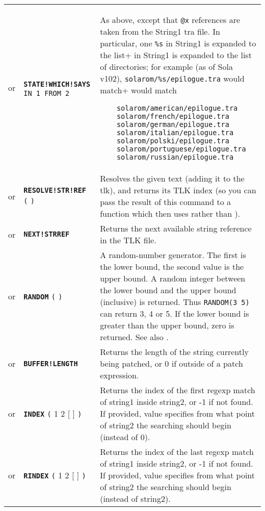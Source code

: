 \documentclass{article}
\def\ttref#1{\ahrefloc{#1}{\tt #1}}
\def\DEFINE#1{{\tt \bf #1}\label{#1}\index{#1}}
\def\DEFSYN#1{{\tt \bf #1}\index{#1}}
\def\t#1{{\tt #1}}
\def\Ob{{\color{red} [ }}
\def\Oe{{\color{red} ] }}
\begin{document}
\begin{tabular}{cp{10in}|p{10in}}
or & \DEFSYN{STATE!WHICH!SAYS} \t{\ttref{value} IN \ttref{String}1 FROM \ttref{String}2} &
  As above, except that \t{@x} references are taken from
    the String1 tra file. In particular, one \verb+%s+ in String1 is expanded to the list
    of directories; for example (as of Sola v102), \verb+solarom/%s/epilogue.tra+ would match
\begin{verbatim}
    solarom/american/epilogue.tra
    solarom/french/epilogue.tra
    solarom/german/epilogue.tra
    solarom/italian/epilogue.tra
    solarom/polski/epilogue.tra
    solarom/portuguese/epilogue.tra
    solarom/russian/epilogue.tra
\end{verbatim}
\\
or & \DEFINE{RESOLVE!STR!REF} \t{(} \ttref{text} \t{)} &
Resolves the given text (adding it to the tlk), and returns its TLK index
(so you can pass the result of this command to a function which then uses
\ttref{WRITE!LONG} rather than \ttref{SAY}).
\\
or & \DEFINE{NEXT!STRREF} &
Returns the next available string reference in the TLK file.
\\
or & \DEFINE{RANDOM} \t{(} \ttref{value} \ttref{value} \t{)} &
A random-number generator. The first \ttref{value} is the lower bound, the
second value is the upper bound. A random integer between the lower bound
and the upper bound (inclusive) is returned. Thus \t{RANDOM(3 5)} can
return 3, 4 or 5. If the lower bound is greater than the upper bound, zero
is returned. See also \ttref{RANDOM!SEED}. \\

or & \DEFINE{BUFFER!LENGTH} &
Returns the length of the string currently being patched, or 0 if outside of
a patch expression. \\

or & \DEFINE{INDEX} \t{(} \ttref{optcase}  \ttref{optexact} \ttref{string}1
\ttref{string}2 \Ob \ttref{value} \Oe \t{)} &
Returns the index of the first regexp match of string1 inside string2, or
-1 if not found. If provided, value specifies from what point of string2
the searching should begin (instead of 0).
\\

or & \DEFINE{RINDEX} \t{(}  \ttref{optcase}  \ttref{optexact} \ttref{string}1
\ttref{string}2 \Ob \ttref{value} \Oe \t{)} &
Returns the index of the last regexp match of string1 inside string2, or
-1 if not found. If provided, value specifies from what point of string2
the searching should begin (instead of \ttref{STRING!LENGTH} string2).
\\


\end{tabular}
\end{document}
